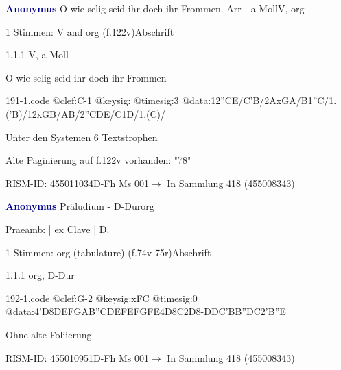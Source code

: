 \documentclass[twocolumn, 12pt]{book}
\begin{document}
\par \vspace{16pt} \textcolor{darkblue}{\textbf{Anonymus  }}\hfillplus{\textbf{[191]}}\newline O wie selig seid ihr doch ihr Frommen. Arr - a-Moll\newline V, org
\par \begin{itshape}\end{itshape} 
\par \textcolor{darkblue}{}  1 Stimmen: V and org  (f.122v)\newline Abschrift
\par 1.1.1  V, a-Moll\newline \begin{footnotesize} O wie selig seid ihr doch ihr Frommen \end{footnotesize}  
\begin{filecontents*}{191-1.code}
@clef:C-1
@keysig:
@timesig:3
@data:12''CE/C'B/2AxGA/B1''C/1.('B)/12xGB/AB/2''CDE/C1D/1.(C)/
\end{filecontents*}
\newline %
\par Unter den Systemen 6 Textstrophen
\par Alte Paginierung auf f.122v vorhanden: "78"
\par RISM-ID: 455011034\newline D-Fh  Ms 001\newline $\rightarrow$ In Sammlung 418 (455008343)
      
\par \vspace{16pt} \textcolor{darkblue}{\textbf{Anonymus  }}\hfillplus{\textbf{[192]}}\newline Präludium - D-Dur\newline org
\par \begin{itshape}[f.74v, at left:] Praeamb: | ex Clave | D.\end{itshape} 
\par \textcolor{darkblue}{}  1 Stimmen: org (tabulature)  (f.74v-75r)\newline Abschrift
\par 1.1.1  org, D-Dur  
\begin{filecontents*}{192-1.code}
@clef:G-2
@keysig:xFC
@timesig:0
@data:4'D{8DE}{FGAB}{''CDEF}{EFGF}E4D8C2D8-{DDC}{'BB''DC}2'B''E
\end{filecontents*}
\newline %
\par Ohne alte Foliierung
\par RISM-ID: 455010951\newline D-Fh  Ms 001\newline $\rightarrow$ In Sammlung 418 (455008343)
      
\end{document}
